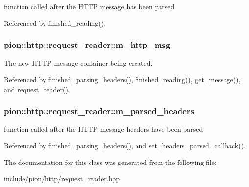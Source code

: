 function called after the H\-T\-T\-P message has been parsed 



Referenced by finished\-\_\-reading().

\hypertarget{classpion_1_1http_1_1request__reader_a670ecf2327f01509109043f182a04ab7}{
\subsubsection[{m\-\_\-http\-\_\-msg}]{ pion\-::http\-::request\-\_\-reader\-::m\-\_\-http\-\_\-msg\hspace{0.3cm}{\ttfamily [protected]}}}\label{classpion_1_1http_1_1request__reader_a670ecf2327f01509109043f182a04ab7}


The new H\-T\-T\-P message container being created. 



Referenced by finished\-\_\-parsing\-\_\-headers(), finished\-\_\-reading(), get\-\_\-message(), and request\-\_\-reader().

\hypertarget{classpion_1_1http_1_1request__reader_ac57f7fe823e1a5c560907fa192b56fd5}{
\subsubsection[{m\-\_\-parsed\-\_\-headers}]{ pion\-::http\-::request\-\_\-reader\-::m\-\_\-parsed\-\_\-headers\hspace{0.3cm}{\ttfamily [protected]}}}\label{classpion_1_1http_1_1request__reader_ac57f7fe823e1a5c560907fa192b56fd5}


function called after the H\-T\-T\-P message headers have been parsed 



Referenced by finished\-\_\-parsing\-\_\-headers(), and set\-\_\-headers\-\_\-parsed\-\_\-callback().



The documentation for this class was generated from the following file\-:\begin{DoxyCompactItemize}
\item 
include/pion/http/\hyperlink{request__reader_8hpp}{request\-\_\-reader.\-hpp}\end{DoxyCompactItemize}
